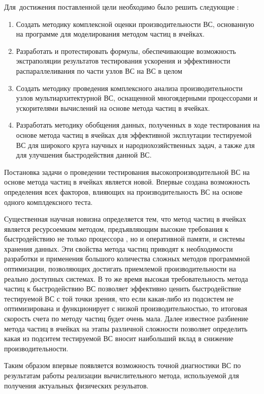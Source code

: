 Для~достижения поставленной цели необходимо было решить следующие {\tasks}:
\begin{enumerate}
	\item Создать методику комплексной оценки производительности ВС, основанную на программе для моделирования методом частиц в ячейках.
	\item Разработать и протестировать формулы, обеспечивающие возможность экстраполяции результатов тестирования ускорения и эффективности распараллеливания по части узлов ВС на ВС в целом
	\item Создать методику проведения комплексного анализа производительности узлов мультиархитектурной ВС, оснащенной многоядерными процессорами и ускорителями вычислений на основе метода частиц в ячейках.
	\item Разработать методику обобщения данных, полученных в ходе тестирования на основе метода частиц в ячейках для эффективной эксплутации тестируемой ВС для широкого круга научных и народнохозяйственных задач, а также для для улучшения быстродействия данной ВС. 
\end{enumerate}


{\novelty}
Постановка задачи о проведении тестирования высокопроизводительной ВС на основе метода частиц в ячейках является новой. Впервые создана возможность определения всех факторов, влияющих на производительность ВС на основе одного комплдексного теста. 

Существенная научная новизна определяется тем, что метод частиц в ячейках является ресурсоемким методом, предъявляющим высокие требования к быстродействию не только процессора , но и оперативной памяти, и системы хранения данных. Эти свойства метода частиц приводят к необходимости разработки и применения большого количества сложных методов программной оптимизации, позволяющих достигать приемлемой производительности на реально доступных системах. В то же время высокая требовательность метода частиц к быстродействию ВС позволяет эффективно ценить быстродействие тестируемой ВС с той точки зрения, что если какая-либо из подсистем не оптимизирована и функционирует с низкой производительностью, то итоговая скорость счета по методу частиц будет очень мала. Далее известное разбиение метода частиц в ячейках на этапы различной сложности позволяет определить какая из подситем тестируемой ВС вносит наибольший вклад в снижение производительности. 

Таким образом впервые появляется возможность точной диагностики ВС по результатам работы реализации вычислительного метода, используемой для получения актуальных физических резульатов.   

